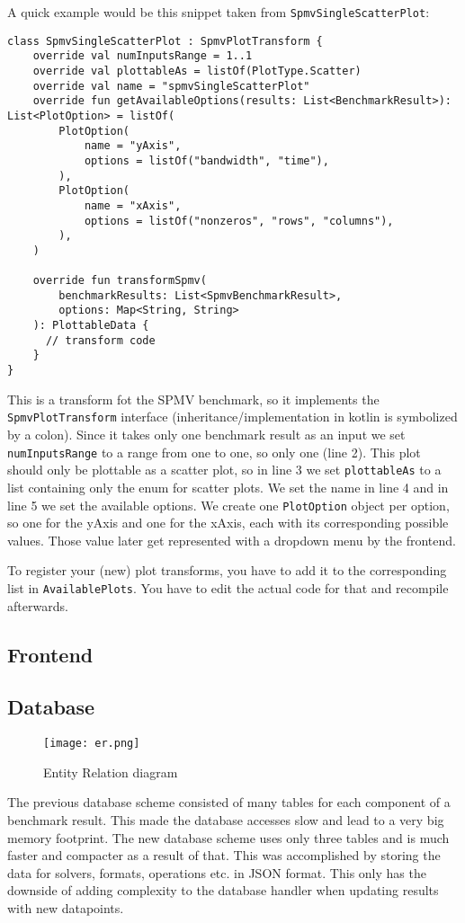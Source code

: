 A quick example would be this snippet taken from \texttt{SpmvSingleScatterPlot}:

\begin{lstlisting}[style=JAVA]
class SpmvSingleScatterPlot : SpmvPlotTransform {
    override val numInputsRange = 1..1
    override val plottableAs = listOf(PlotType.Scatter)
    override val name = "spmvSingleScatterPlot"
    override fun getAvailableOptions(results: List<BenchmarkResult>): List<PlotOption> = listOf(
        PlotOption(
            name = "yAxis",
            options = listOf("bandwidth", "time"),
        ),
        PlotOption(
            name = "xAxis",
            options = listOf("nonzeros", "rows", "columns"),
        ),
    )

    override fun transformSpmv(
        benchmarkResults: List<SpmvBenchmarkResult>,
        options: Map<String, String>
    ): PlottableData {
      // transform code
    }
}
\end{lstlisting}

This is a transform fot the SPMV benchmark, so it implements the \texttt{SpmvPlotTransform} interface (inheritance/implementation in kotlin is symbolized by a colon). Since it takes only one benchmark result as an input we set \texttt{numInputsRange} to a range from one to one, so only one (line 2). This plot should only be plottable as a scatter plot, so in line 3 we set \texttt{plottableAs} to a list containing only the enum for scatter plots. We set the name in line 4 and in line 5 we set the available options. We create one \texttt{PlotOption} object per option, so one for the yAxis and one for the xAxis, each with its corresponding possible values. Those value later get represented with a dropdown menu by the frontend.

To register your (new) plot transforms, you have to add it to the corresponding list in \texttt{AvailablePlots}. You have to edit the actual code for that and recompile afterwards.

\subsection{Frontend}

\subsection{Database}  

\begin{figure}[H]
	\centering
	\texttt{[image: er.png]}
	\caption{Entity Relation diagram}
  \label{fig:er}
\end{figure}

The previous database scheme consisted of many tables for each component of a benchmark result. This made the database accesses slow and lead to a very big memory footprint. The new database scheme uses only three tables and is much faster and compacter as a result of that. This was accomplished by storing the data for solvers, formats, operations etc. in JSON format. This only has the downside of adding complexity to the database handler when updating results with new datapoints.
